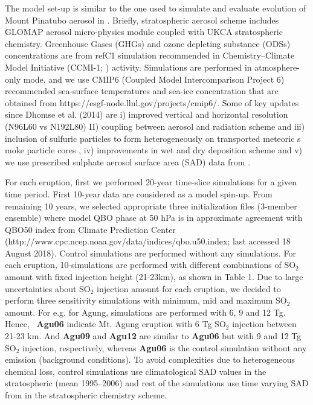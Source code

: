 \documentclass[journal abbreviation, manuscript]{copernicus}
\newcommand\agub{{\bf Agu06}\xspace}
\newcommand\aguc{{\bf Agu09}\xspace}
\newcommand\agud{{\bf Agu12}\xspace}
\begin{document}
The model set-up is similar to the one used to simulate and evaluate evolution of 
Mount Pinatubo aerosol in \citep{Dhomse2014}. Briefly, stratospheric aerosol
scheme includes GLOMAP aerosol micro-physics module coupled with UKCA stratospheric
 chemistry. Greenhouse Gases (GHGs) and ozone depleting substance (ODSs) 
concentrations are from refC1 simulation recommended in  
Chemistry–Climate Model Initiative (CCMI-1; \cite{Eyring2013, Morgenstern2017})
 activity. Simulations are  performed in atmosphere-only mode, and we use CMIP6 
(Coupled Model Intercomparison Project 6) recommended  sea-surface temperatures 
and sea-ice concentration that are obtained from https://esgf-node.llnl.gov/projects/cmip6/.  
Some of key updates since  Dhomse et al. (2014) are i) improved vertical and horizontal 
resolution (N96L60 vs N192L80) II) coupling between aerosol and radiation scheme \citep{Mann2015} and 
iii) inclusion of sulfuric particles to form heterogeneously on transported meteoric s
moke particle cores \citep{Brooks2017}, iv) improvements in wet and dry deposition scheme 
\citet{Marshall2018} and v) we use prescribed sulphate aerosol surface area (SAD)
 data from \cite{Arfeuille2013}. 

For each eruption, first we performed 20-year time-slice simulations for a given 
time period. First 10-year data are considered as a model spin-up.  From remaining 
10 years, we selected appropriate three initialization files (3-member ensemble)
 where model QBO phase at 50 hPa is in approximate agreement with QBO50 index from
 Climate Prediction Center (http://www.cpc.ncep.noaa.gov/data/indices/qbo.u50.index; 
last accessed 18 August 2018). Control simulations are performed without any simulations.
 For each eruption, 10-simulations are performed with different combinations of SO$_2$ amount
with fixed injection height (21-23km), as shown in Table 1.   
Due to large uncertainties about SO$_2$ injection amount for each eruption, we decided to 
perform three sensitivity simulations with minimum, mid and maximum SO$_2$ amount. For e.g. 
for Agung, simulations are performed with 6, 9 and 12 Tg. 
Hence, ~\agub indicate Mt. Agung eruption with 6 Tg SO$_2$ injection 
between 21-23 km. And \aguc and \agud  are similar to \agub but
 with 9 and 12 Tg SO$_2$ injection, respectively, whereas \agub is the
control simulation without any  emission (background conditions). 
To avoid complexities due to heterogeneous 
chemical loss, control simulations use climatological SAD values in the
stratospheric (mean 1995--2006) and rest of the simulations use time varying SAD from 
\cite{Arfeuille2013} in the stratospheric chemistry scheme. 
\end{document}
